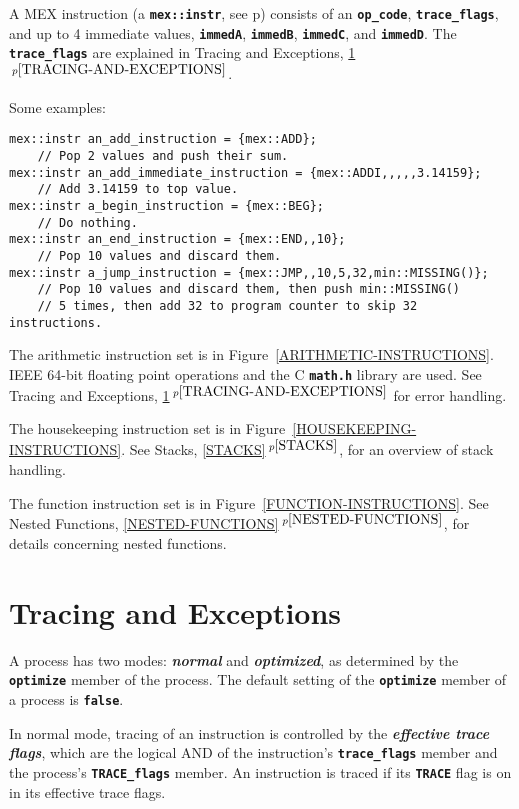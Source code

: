 \documentclass[12pt]{article}
\newcommand{\TT}[1]{{\tt \bfseries #1}}
\newcommand{\key}[1]{{\bf \em #1}\index{#1}}
\newcommand{\itemref}[1]{\ref{#1}$\,^{p\pageref{#1}}$}
\newcommand{\pagref}[1]{p\pageref{#1}}
\newenvironment{indpar}[1][0.3in]%
	{\begin{list}{}%
		     {\setlength{\itemsep}{0in}%
		      \setlength{\topsep}{0in}%
		      \setlength{\parsep}{1ex}%
		      \setlength{\labelwidth}{#1}%
		      \setlength{\leftmargin}{#1}%
		      \addtolength{\leftmargin}{\labelsep}}%
	 \item}%
	{\end{list}}
\begin{document}
A MEX instruction (a \TT{mex::instr}, see \pagref{MEX::INSTR})
consists of an \TT{op\_code}, \TT{trace\_flags},
and up to 4 immediate values,
\TT{immedA}, \TT{immedB}, \TT{immedC}, and \TT{immedD}.
The \TT{trace\_flags} are explained in Tracing and Exceptions,
\itemref{TRACING-AND-EXCEPTIONS}.

Some examples:
\begin{indpar}\begin{verbatim}
mex::instr an_add_instruction = {mex::ADD};
    // Pop 2 values and push their sum.
mex::instr an_add_immediate_instruction = {mex::ADDI,,,,,3.14159};
    // Add 3.14159 to top value.
mex::instr a_begin_instruction = {mex::BEG};
    // Do nothing.
mex::instr an_end_instruction = {mex::END,,10};
    // Pop 10 values and discard them.
mex::instr a_jump_instruction = {mex::JMP,,10,5,32,min::MISSING()};
    // Pop 10 values and discard them, then push min::MISSING()
    // 5 times, then add 32 to program counter to skip 32 instructions.
\end{verbatim}\end{indpar}

The arithmetic instruction set is in Figure~\ref{ARITHMETIC-INSTRUCTIONS}.
IEEE 64-bit floating point operations and the C \TT{math.h}
library are used.  See Tracing and Exceptions,
\itemref{TRACING-AND-EXCEPTIONS} for error
handling.

The housekeeping instruction set is in
Figure~\ref{HOUSEKEEPING-INSTRUCTIONS}.
See Stacks, \itemref{STACKS}, for an overview of stack handling.

The function instruction set is in
Figure~\ref{FUNCTION-INSTRUCTIONS}.
See Nested Functions, \itemref{NESTED-FUNCTIONS},
for details concerning nested functions.

\section{Tracing and Exceptions}
\label{TRACING-AND-EXCEPTIONS}

A process has two modes: \key{normal} and \key{optimized}, as
determined by the \TT{optimize} member of the process.
The default setting of the \TT{optimize} member of a process
is \TT{false}.

In normal mode, tracing of an instruction
is controlled by the \key{effective trace flags},
which are the logical AND of the instruction's \TT{trace\_flags}
member and the process's \TT{TRACE\_flags} member.
An instruction is traced if its \TT{TRACE} flag is on
in its effective trace flags.
\end{document}
